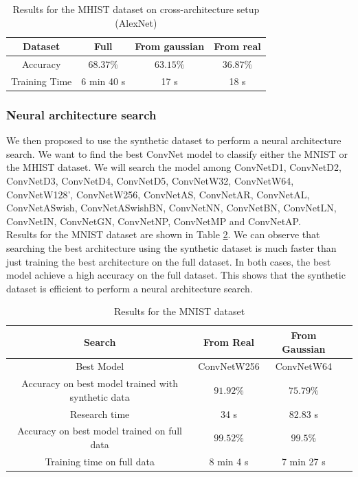 \documentclass[onecolumn]{IEEEtran}
\begin{document}
\begin{table}[H]
    \centering
    \begin{tabular}{|c|c|c|c|}
        \hline
        Dataset & Full & From gaussian & From real \\
        \hline
        Accuracy & $68.37\%$ & $63.15\%$ & $36.87\%$ \\
        \hline
        Training Time & 6 min 40 s & 17 s & 18 s \\
        \hline
    \end{tabular}
    \caption{Results for the MHIST dataset on cross-architecture setup (AlexNet)}
    \label{tab:MHIST_results_cross_architecture}
\end{table}

\subsubsection{Neural architecture search}
We then proposed to use the synthetic dataset to perform a neural architecture search. We want to find the best ConvNet model to classify either the MNIST or the MHIST dataset. We will search the model among ConvNetD1, ConvNetD2, ConvNetD3, ConvNetD4, ConvNetD5, ConvNetW32, ConvNetW64, ConvNetW128', ConvNetW256, ConvNetAS, ConvNetAR, ConvNetAL, ConvNetASwish, ConvNetASwishBN, ConvNetNN, ConvNetBN, ConvNetLN, ConvNetIN, ConvNetGN, ConvNetNP, ConvNetMP and  ConvNetAP.
\\
Results for the MNIST dataset are shown in Table \ref{tab:NAS_results_MNIST}. We can observe that searching the best architecture using the synthetic dataset is much faster than just training the best architecture on the full dataset. In both cases, the best model achieve a high accuracy on the full dataset. This shows that the synthetic dataset is efficient to perform a neural architecture search.
\begin{table}[H]
    \centering
    \begin{tabular}{|c|c|c|c|}
        \hline
        Search & From Real & From Gaussian \\
        \hline
        Best Model & ConvNetW256 & ConvNetW64\\
        \hline
        Accuracy on best model trained with synthetic data & $91.92\%$ & $75.79\%$ \\
        \hline
        Research time & 34 s & 82.83 s \\
        \hline
        Accuracy on best model trained on full data & $99.52\%$ & $99.5\%$ \\
        \hline
        Training time on full data & 8 min 4 s & 7 min 27 s \\
        \hline
    \end{tabular}
    \caption{Results for the MNIST dataset}
    \label{tab:NAS_results_MNIST}
\end{table}
\end{document}
